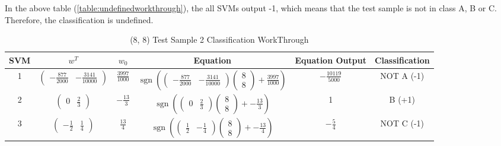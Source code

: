 \documentclass[12pt]{report}
\begin{document}
In the above table (\ref{table:undefinedworkthrough}), the all SVMs output -1, which means that the test sample is not in class A, B or C. Therefore, the classification is undefined.

\begin{table}[H]
	\begin{adjustbox}{width=1.2\textwidth}
		\begin{tabular}{| c | c | c | c | c | c |}
			\hline
			SVM & $w^T$                                                              & $w_{0}$         & Equation & Equation Output & Classification \\ [0.5ex]
			\hline
			1   & $\begin{pmatrix}-\frac{877}{2000}&-\frac{3141}{10000}\end{pmatrix}
			$   & $
				\frac{3997}{1000}
			$   & $
				\mathop{sgn}(\begin{pmatrix}-\frac{877}{2000}&-\frac{3141}{10000}\end{pmatrix} \begin{pmatrix}8\\ 8\end{pmatrix} + \frac{3997}{1000})
			$   & $
				-\frac{10119}{5000}
			$   & NOT A (-1)                                                                                                                         \\
			\hline
			2   & $\begin{pmatrix}0&\frac{2}{3}\end{pmatrix}$                        & $-\frac{13}{3}$ & $
				\mathop{sgn}(\begin{pmatrix}0&\frac{2}{3}\end{pmatrix} \begin{pmatrix}8\\ 8\end{pmatrix} + -\frac{13}{3})
			$   & 1                                                                  & B (+1)                                                        \\
			\hline
			3   & $\begin{pmatrix}-\frac{1}{2}&\frac{1}{4}\end{pmatrix}$             & $\frac{13}{4}$  & $
				\mathop{sgn}(\begin{pmatrix}\frac{1}{2}&-\frac{1}{4}\end{pmatrix} \begin{pmatrix}8\\ 8\end{pmatrix} + -\frac{13}{4})
			$   & $
				-\frac{5}{4}
			$   & NOT C (-1)                                                                                                                         \\
			\hline
		\end{tabular}
	\end{adjustbox}
	\caption{(8, 8) Test Sample 2 Classification WorkThrough}
	\label{table:test2sampleworkthrough}
\end{table}
\end{document}
